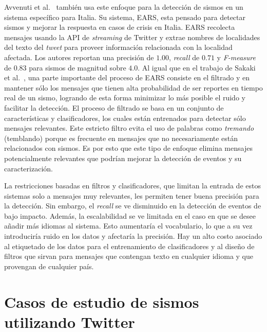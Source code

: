 Avvenuti et al.~\cite{avvenuti2014earthquake, avvenuti2014ears} también usa este enfoque para la detección de sismos en un sistema específico para Italia.
%
Su sistema, EARS, esta pensado para detectar sismos y mejorar la respuesta en casos de crisis en Italia.
%
EARS recolecta mensajes usando la API de \textit{streaming} de Twitter y extrae nombres de localidades del texto del {\em tweet} para proveer información relacionada con la localidad afectada.
%
Los autores reportan una precisión de $1.00$, {\em recall} de $0.71$ y {\em F-measure} de $0.83$ para sismos  de magnitud sobre $4.0$. 
%
Al igual que en el trabajo de Sakaki et al.~\cite{sakaki2013tweet}, una parte importante del proceso de EARS consiste en el filtrado y en mantener sólo los mensajes que tienen alta probabilidad de ser reportes en tiempo real de un sismo, logrando de esta forma minimizar lo más posible el ruido y facilitar la detección.
%
El proceso de filtrado se basa en un conjunto de características y clasificadores, los cuales están entrenados para detectar sólo mensajes relevantes. 
%
Este estricto filtro evita el uso de palabras como \textit{tremando} (temblando) porque es frecuente en mensajes que no necesariamente están relacionados con sismos. 
%
Es por esto que este tipo de enfoque elimina mensajes potencialmente relevantes que podrían mejorar la detección de eventos y su caracterización.  


La restricciones basadas en filtros y clasificadores, que limitan la entrada de estos sistemas solo a mensajes muy relevantes, les permiten tener buena precisión para la detección. 
%
Sin embargo, el \textit{recall} se ve disminuido en la detección de eventos de bajo impacto. 
%
Además, la escalabilidad se ve limitada en el caso en que se desee añadir más idiomas al sistema. 
%
Esto aumentaría el vocabulario, lo que a su vez introduciría ruido en los datos y afectaría la precisión. 
%
Hay un alto costo asociado al etiquetado de los datos para el entrenamiento de clasificadores y al diseño de filtros que sirvan para mensajes que contengan texto en cualquier idioma y que provengan de cualquier país.

\section{Casos de estudio de sismos utilizando Twitter}
\label{sec:otroscasos}


